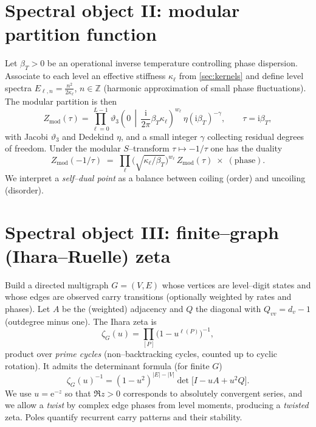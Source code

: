 \documentclass[11pt]{article}
\newcommand{\Z}{\mathbb{Z}}
\newcommand{\e}{\mathrm{e}}
\newcommand{\ii}{\mathrm{i}}
\begin{document}
\section{Spectral object II: modular partition function}
\label{sec:modular}
Let $\beta_T>0$ be an operational inverse temperature controlling phase dispersion.
Associate to each level an effective stiffness $\kappa_\ell$ from \cref{sec:kernels} and define level spectra $E_{\ell,n}=\frac{n^2}{2\kappa_\ell}$, $n\in\Z$ (harmonic approximation of small phase fluctuations).
The modular partition is then
\begin{equation}
Z_{\mathrm{mod}}(\tau)=\prod_{\ell=0}^{L-1}\vartheta_3\!\left(0\,\middle|\,\frac{\ii}{2\pi}\beta_T \kappa_\ell\right)^{w_\ell}\,\eta(\ii \beta_T)^{-\gamma},
\qquad \tau=\ii\beta_T,
\end{equation}
with Jacobi $\vartheta_3$ and Dedekind $\eta$, and a small integer $\gamma$ collecting residual degrees of freedom.
Under the modular $S$--transform $\tau\mapsto -1/\tau$ one has the duality
\begin{equation}
Z_{\mathrm{mod}}(-1/\tau)\;=\;\prod_\ell \bigl(\sqrt{\kappa_\ell/\beta_T}\bigr)^{w_\ell}\,Z_{\mathrm{mod}}(\tau)\;\times\; (\text{phase}).
\end{equation}
We interpret a \emph{self--dual point} as a balance between coiling (order) and uncoiling (disorder).

\section{Spectral object III: finite--graph (Ihara--Ruelle) zeta}
\label{sec:ihara}
Build a directed multigraph $G=(V,E)$ whose vertices are level--digit states and whose edges are observed carry transitions (optionally weighted by rates and phases).
Let $A$ be the (weighted) adjacency and $Q$ the diagonal with $Q_{vv}=d_v-1$ (outdegree minus one).
The Ihara zeta is
\begin{equation}
\zeta_G(u)=\prod_{[P]}\bigl(1-u^{\ell(P)}\bigr)^{-1},
\end{equation}
product over \emph{prime cycles} (non--backtracking cycles, counted up to cyclic rotation).
It admits the determinant formula (for finite $G$)
\begin{equation}
\zeta_G(u)^{-1}=(1-u^2)^{|E|-|V|}\det\!\bigl[I - u A + u^2 Q\bigr].
\end{equation}
We use $u=\e^{-z}$ so that $\Re z>0$ corresponds to absolutely convergent series, and we allow a \emph{twist} by complex edge phases from level moments, producing a \emph{twisted} zeta. Poles quantify recurrent carry patterns and their stability.
\end{document}
